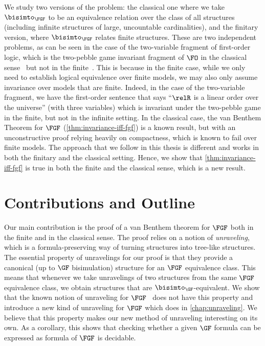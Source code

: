 We study two versions of the problem: the classical one where we take $\bisimto_{\FGF}$ to be an equivalence relation over the class of all structures (including infinite structures of large, uncountable cardinalities), and the finitary version, where $\bisimto_{\FGF}$ relates finite structures.
These are two independent problems, as can be seen in the case of the two-variable fragment of first-order logic, which is the two-pebble game invariant fragment of $\FO$ in the classical sense~\cite{gradel1999} but not in the finite~\cite{otto2017}.
This is because in the finite case, while we only need to establish logical equivalence over finite models, we may also only assume invariance over models that are finite.
Indeed, in the case of the two-variable fragment, we have the first-order sentence that says ``$\relR$ is a linear order over the universe'' (with three variables) which is invariant under the two-pebble game in the finite, but not in the infinite setting.
In the classical case, the van Benthem Theorem for $\FGF$ (\cref{thm:invariance-iff-fgf}) is a known result, but with an unconstructive proof relying heavily on compactness, which is known to fail over finite models.
The approach that we follow in this thesis is different and works in both the finitary and the classical setting.
Hence, we show that \cref{thm:invariance-iff-fgf} is true in both the finite and the classical sense, which is a new result.

\section{Contributions and Outline}

Our main contribution is the proof of a van Benthem theorem for $\FGF$ both in the finite and in the classical sense.
The proof relies on a notion of \emph{unraveling}, which is a formula-preserving way of turning structures into tree-like structures.
The essential property of unravelings for our proof is that they provide a canonical (up to $\GF$ bisimulation) structure for an $\FGF$ equivalence class.
This means that whenever we take unravelings of two structures from the same $\FGF$ equivalence class, we obtain structures that are $\bisimto_{\GF}$-equivalent.
We show that the known notion of unraveling for $\FGF$~\cite{Bednarczyk21} does not have this property and introduce a new kind of unraveling for $\FGF$ which does in \cref{chap:unraveling}.
We believe that this property makes our new method of unraveling interesting on its own.
As a corollary, this shows that checking whether a given $\GF$ formula can be expressed as formula of $\FGF$ is decidable.

